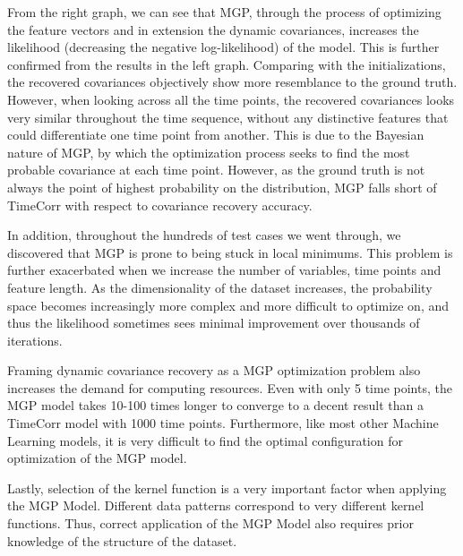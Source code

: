 \documentclass[12pt]{article}
\begin{document}
From the right graph, we can see that MGP, through the process of optimizing the feature vectors and in extension the dynamic covariances, increases the likelihood (decreasing the negative log-likelihood) of the model. This is further confirmed from the results in the left graph. Comparing with the initializations, the recovered covariances objectively show more resemblance to the ground truth. However, when looking across all the time points, the recovered covariances looks very similar throughout the time sequence, without any distinctive features that could differentiate one time point from another. This is due to the Bayesian nature of MGP, by which the optimization process seeks to find the most probable covariance at each time point. However, as the ground truth is not always the point of highest probability on the distribution, MGP falls short of TimeCorr with respect to covariance recovery accuracy.\par

In addition, throughout the hundreds of test cases we went through, we discovered that MGP is prone to being stuck in local minimums. This problem is further exacerbated when we increase the number of variables, time points and feature length. As the dimensionality of the dataset increases, the probability space becomes increasingly more complex and more difficult to optimize on, and thus the likelihood sometimes sees minimal improvement over thousands of iterations.\par

Framing dynamic covariance recovery as a MGP optimization problem also increases the demand for computing resources. Even with only 5 time points, the MGP model takes 10-100 times longer to converge to a decent result than a TimeCorr model with 1000 time points. Furthermore, like most other Machine Learning models, it is very difficult to find the optimal configuration for optimization of the MGP model.\par

Lastly, selection of the kernel function is a very important factor when applying the MGP Model. Different data patterns correspond to very different kernel functions. Thus, correct application of the MGP Model also requires prior knowledge of the structure of the dataset.\par
\end{document}
